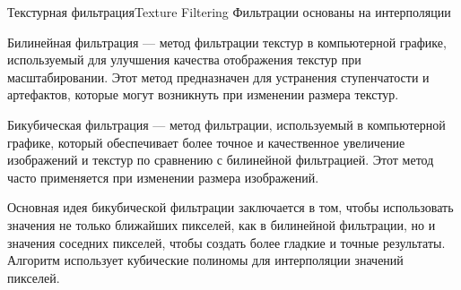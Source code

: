 \documentclass{beamer}
\begin{document}
	\begin{frame}{Текстурная фильтрация}{Texture Filtering}
		Фильтрации основаны на интерполяции
		
		Билинейная фильтрация --- метод фильтрации текстур в компьютерной графике, используемый для улучшения качества отображения текстур при масштабировании. Этот метод предназначен для устранения ступенчатости и артефактов, которые могут возникнуть при изменении размера текстур.


		Бикубическая фильтрация --- метод фильтрации, используемый в компьютерной графике, который обеспечивает более точное и качественное увеличение изображений и текстур по сравнению с билинейной фильтрацией. Этот метод часто применяется при изменении размера изображений.

		{\footnotesize
			Основная идея бикубической фильтрации заключается в том, чтобы использовать значения не только ближайших пикселей, как в билинейной фильтрации, но и значения соседних пикселей, чтобы создать более гладкие и точные результаты. Алгоритм использует кубические полиномы для интерполяции значений пикселей.
		}



	\end{frame}
\end{document}

